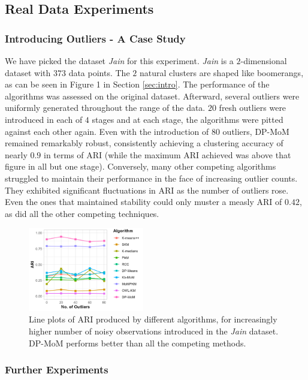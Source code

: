 \documentclass[11pt]{article}
\begin{document}
\subsection{Real Data Experiments}

\subsubsection{Introducing Outliers - A Case Study}

We have picked the dataset \textit{Jain} \citep{jain-dataset} for this experiment. \textit{Jain} is a $2$-dimensional dataset with $373$ data points. The $2$ natural clusters are shaped like boomerangs, as can be seen in Figure 1 in Section \ref{sec:intro}. The performance of the algorithms was assessed on the original dataset. Afterward, several outliers were uniformly generated throughout the range of the data. $20$ fresh outliers were introduced in each of $4$ stages and at each stage, the algorithms were pitted against each other again. Even with the introduction of $80$ outliers, DP-MoM remained remarkably robust, consistently achieving a clustering accuracy of nearly $0.9$ in terms of ARI  (while the maximum ARI achieved was above that figure in all but one stage). Conversely, many other competing algorithms struggled to maintain their performance in the face of increasing outlier counts. They exhibited significant fluctuations in ARI as the number of outliers rose. Even the ones that maintained stability could only muster a measly ARI of $0.42$, as did all the other competing techniques.

\begin{figure}[!htb]
    \centering
    \includegraphics[width=0.45\textwidth]{Diagrams/plot-ari-jain-light-0.6.png}
    \caption{Line plots of ARI produced by different algorithms, for increasingly higher number of noisy observations introduced in the \textit{Jain} dataset. DP-MoM performs better than all the competing methods.}
    \label{fig:plot-jain-ari}
\end{figure}

\subsubsection{Further Experiments}
\end{document}
